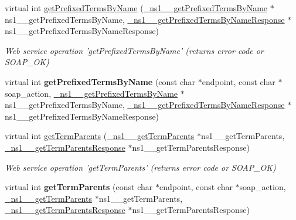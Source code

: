 \begin{DoxyCompactItemize}
\item 
\hypertarget{classOntologyQuerySoapBindingProxy_a0ff897d4959d0c3395baef3d36f648c0}{
virtual int \hyperlink{classOntologyQuerySoapBindingProxy_a0ff897d4959d0c3395baef3d36f648c0}{getPrefixedTermsByName} (\hyperlink{class__ns1____getPrefixedTermsByName}{\_\-ns1\_\-\_\-getPrefixedTermsByName} $\ast$ns1\_\-\_\-getPrefixedTermsByName, \hyperlink{class__ns1____getPrefixedTermsByNameResponse}{\_\-ns1\_\-\_\-getPrefixedTermsByNameResponse} $\ast$ns1\_\-\_\-getPrefixedTermsByNameResponse)}
\label{classOntologyQuerySoapBindingProxy_a0ff897d4959d0c3395baef3d36f648c0}

\begin{DoxyCompactList}\small\item\em Web service operation 'getPrefixedTermsByName' (returns error code or SOAP\_\-OK) \end{DoxyCompactList}\item 
\hypertarget{classOntologyQuerySoapBindingProxy_a2f20a114360f03c33634a812974621e5}{
virtual int {\bfseries getPrefixedTermsByName} (const char $\ast$endpoint, const char $\ast$soap\_\-action, \hyperlink{class__ns1____getPrefixedTermsByName}{\_\-ns1\_\-\_\-getPrefixedTermsByName} $\ast$ns1\_\-\_\-getPrefixedTermsByName, \hyperlink{class__ns1____getPrefixedTermsByNameResponse}{\_\-ns1\_\-\_\-getPrefixedTermsByNameResponse} $\ast$ns1\_\-\_\-getPrefixedTermsByNameResponse)}
\label{classOntologyQuerySoapBindingProxy_a2f20a114360f03c33634a812974621e5}

\item 
\hypertarget{classOntologyQuerySoapBindingProxy_ade10e25d14a9f8c05bd3973f3edfcb38}{
virtual int \hyperlink{classOntologyQuerySoapBindingProxy_ade10e25d14a9f8c05bd3973f3edfcb38}{getTermParents} (\hyperlink{class__ns1____getTermParents}{\_\-ns1\_\-\_\-getTermParents} $\ast$ns1\_\-\_\-getTermParents, \hyperlink{class__ns1____getTermParentsResponse}{\_\-ns1\_\-\_\-getTermParentsResponse} $\ast$ns1\_\-\_\-getTermParentsResponse)}
\label{classOntologyQuerySoapBindingProxy_ade10e25d14a9f8c05bd3973f3edfcb38}

\begin{DoxyCompactList}\small\item\em Web service operation 'getTermParents' (returns error code or SOAP\_\-OK) \end{DoxyCompactList}\item 
\hypertarget{classOntologyQuerySoapBindingProxy_aad642e9185bbf1acde71d6a400515dc5}{
virtual int {\bfseries getTermParents} (const char $\ast$endpoint, const char $\ast$soap\_\-action, \hyperlink{class__ns1____getTermParents}{\_\-ns1\_\-\_\-getTermParents} $\ast$ns1\_\-\_\-getTermParents, \hyperlink{class__ns1____getTermParentsResponse}{\_\-ns1\_\-\_\-getTermParentsResponse} $\ast$ns1\_\-\_\-getTermParentsResponse)}
\label{classOntologyQuerySoapBindingProxy_aad642e9185bbf1acde71d6a400515dc5}


\end{DoxyCompactItemize}
